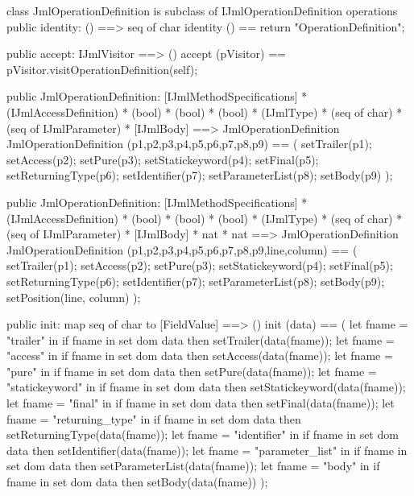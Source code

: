\begin{vdm_al}
class JmlOperationDefinition is subclass of IJmlOperationDefinition
operations
  public identity: () ==> seq of char
  identity () == return "OperationDefinition";

  public accept: IJmlVisitor ==> ()
  accept (pVisitor) == pVisitor.visitOperationDefinition(self);

  public JmlOperationDefinition:
    [IJmlMethodSpecifications] *
    (IJmlAccessDefinition) *
    (bool) *
    (bool) *
    (bool) *
    (IJmlType) *
    (seq of char) *
    (seq of IJmlParameter) *
    [IJmlBody] ==> JmlOperationDefinition
  JmlOperationDefinition (p1,p2,p3,p4,p5,p6,p7,p8,p9) == 
    ( setTrailer(p1);
      setAccess(p2);
      setPure(p3);
      setStatickeyword(p4);
      setFinal(p5);
      setReturningType(p6);
      setIdentifier(p7);
      setParameterList(p8);
      setBody(p9) );

  public JmlOperationDefinition:
    [IJmlMethodSpecifications] *
    (IJmlAccessDefinition) *
    (bool) *
    (bool) *
    (bool) *
    (IJmlType) *
    (seq of char) *
    (seq of IJmlParameter) *
    [IJmlBody] *
    nat *
    nat ==> JmlOperationDefinition
  JmlOperationDefinition (p1,p2,p3,p4,p5,p6,p7,p8,p9,line,column) == 
    ( setTrailer(p1);
      setAccess(p2);
      setPure(p3);
      setStatickeyword(p4);
      setFinal(p5);
      setReturningType(p6);
      setIdentifier(p7);
      setParameterList(p8);
      setBody(p9);
      setPosition(line, column) );

  public init: map seq of char to [FieldValue] ==> ()
  init (data) ==
    ( let fname = "trailer" in
        if fname in set dom data
        then setTrailer(data(fname));
      let fname = "access" in
        if fname in set dom data
        then setAccess(data(fname));
      let fname = "pure" in
        if fname in set dom data
        then setPure(data(fname));
      let fname = "statickeyword" in
        if fname in set dom data
        then setStatickeyword(data(fname));
      let fname = "final" in
        if fname in set dom data
        then setFinal(data(fname));
      let fname = "returning_type" in
        if fname in set dom data
        then setReturningType(data(fname));
      let fname = "identifier" in
        if fname in set dom data
        then setIdentifier(data(fname));
      let fname = "parameter_list" in
        if fname in set dom data
        then setParameterList(data(fname));
      let fname = "body" in
        if fname in set dom data
        then setBody(data(fname)) );


\end{vdm_al}
